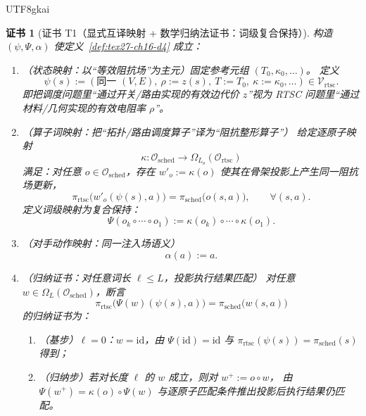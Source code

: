 \documentclass[12pt]{article}
\newtheorem{Certificate}{证书}[section]
\begin{document}
\begin{CJK*}{UTF8}{gkai}
\begin{Certificate}[证书 T1（显式互译映射 + 数学归纳法证书：词级复合保持）]
\label{cert:tex27-ch16-t1}
构造 $(\psi,\Psi,\alpha)$ 使定义~\ref{def:tex27-ch16-d4} 成立：
\begin{enumerate}
  \item（状态映射：以“等效阻抗场”为主元）固定参考元组 $(T_0,\kappa_0,\dots)$。
  定义
  \[
    \psi(s):=(\text{同一 }(V,E),\ \rho:=z(s),\ T:=T_0,\ \kappa:=\kappa_0,\dots)\in\mathcal{V}_{\mathrm{rtsc}}.
  \]
  即把调度问题里“通过开关/路由实现的有效边代价 $z$”视为 RTSC 问题里“通过材料/几何实现的有效电阻率 $\rho$”。
  \item（算子词映射：把“拓扑/路由调度算子”译为“阻抗整形算子”）
  给定逐原子映射
  \[
    \kappa:\mathcal{O}_{\mathrm{sched}}\to \Omega_{L_o}(\mathcal{O}_{\mathrm{rtsc}})
  \]
  满足：对任意 $o\in\mathcal{O}_{\mathrm{sched}}$，存在 $w'_o:=\kappa(o)$ 使其在骨架投影上产生同一阻抗场更新，
  \[
    \pi_{\mathrm{rtsc}}\bigl(w'_o(\psi(s),a)\bigr)=\pi_{\mathrm{sched}}\bigl(o(s,a)\bigr),\qquad \forall(s,a).
  \]
  定义词级映射为复合保持：
  \[
    \Psi(o_k\circ\cdots\circ o_1):=\kappa(o_k)\circ\cdots\circ\kappa(o_1).
  \]
  \item（对手动作映射：同一注入场语义）
  \[
    \alpha(a):=a.
  \]
  \item（归纳证书：对任意词长 $\ell\le L$，投影执行结果匹配）
  对任意 $w\in\Omega_L(\mathcal{O}_{\mathrm{sched}})$，断言
  \[
    \pi_{\mathrm{rtsc}}\bigl(\Psi(w)(\psi(s),a)\bigr)=\pi_{\mathrm{sched}}\bigl(w(s,a)\bigr)
  \]
  的归纳证书为：
  \begin{enumerate}
    \item（基步）$\ell=0$：$w=\mathrm{id}$，由 $\Psi(\mathrm{id})=\mathrm{id}$ 与 $\pi_{\mathrm{rtsc}}(\psi(s))
      =\pi_{\mathrm{sched}}(s)$ 得到；
    \item（归纳步）若对长度 $\ell$ 的 $w$ 成立，则对 $w^+:=o\circ w$，
    由 $\Psi(w^+)=\kappa(o)\circ\Psi(w)$ 与逐原子匹配条件推出投影后执行结果仍匹配。
  \end{enumerate}
\end{enumerate}
\end{Certificate}


\end{CJK*}
\end{document}
